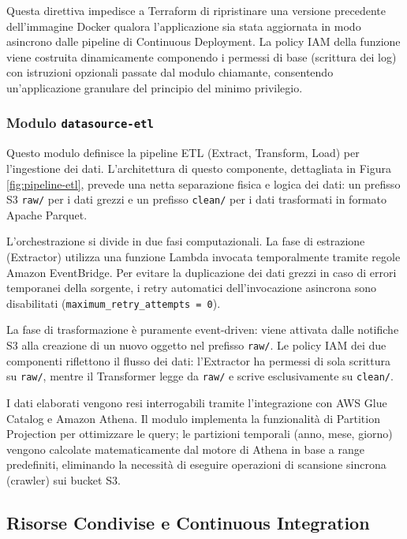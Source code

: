 Questa direttiva impedisce a Terraform di ripristinare una versione precedente dell'immagine Docker qualora l'applicazione sia stata aggiornata in modo asincrono dalle pipeline di Continuous Deployment. La policy IAM della funzione viene costruita dinamicamente componendo i permessi di base (scrittura dei log) con istruzioni opzionali passate dal modulo chiamante, consentendo un'applicazione granulare del principio del minimo privilegio.

\subsubsection{Modulo \texttt{datasource-etl}}

Questo modulo definisce la pipeline ETL (Extract, Transform, Load) per l'ingestione dei dati. L'architettura di questo componente, dettagliata in Figura \ref{fig:pipeline-etl}, prevede una netta separazione fisica e logica dei dati: un prefisso S3 \texttt{raw/} per i dati grezzi e un prefisso \texttt{clean/} per i dati trasformati in formato Apache Parquet.

L'orchestrazione si divide in due fasi computazionali. La fase di estrazione (Extractor) utilizza una funzione Lambda invocata temporalmente tramite regole Amazon EventBridge. Per evitare la duplicazione dei dati grezzi in caso di errori temporanei della sorgente, i retry automatici dell'invocazione asincrona sono disabilitati (\texttt{maximum\_retry\_attempts = 0}).

La fase di trasformazione è puramente event-driven: viene attivata dalle notifiche S3 alla creazione di un nuovo oggetto nel prefisso \texttt{raw/}. Le policy IAM dei due componenti riflettono il flusso dei dati: l'Extractor ha permessi di sola scrittura su \texttt{raw/}, mentre il Transformer legge da \texttt{raw/} e scrive esclusivamente su \texttt{clean/}.

I dati elaborati vengono resi interrogabili tramite l'integrazione con AWS Glue Catalog e Amazon Athena. Il modulo implementa la funzionalità di Partition Projection per ottimizzare le query; le partizioni temporali (anno, mese, giorno) vengono calcolate matematicamente dal motore di Athena in base a range predefiniti, eliminando la necessità di eseguire operazioni di scansione sincrona (crawler) sui bucket S3.

\subsection{Risorse Condivise e Continuous Integration}

